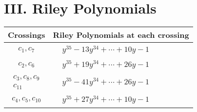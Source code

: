 \documentclass[1p]{elsarticle_modified}
\theoremstyle{definition}
\begin{document}
\centering \section*{ III. Riley Polynomials}
\begin{tabular}{m{50pt}|m{274pt}}
Crossings & \hspace{64pt}Riley Polynomials at each crossing \\
\hline $$\begin{aligned}c_{1},c_{7}\end{aligned}$$&$\begin{aligned}
&y^{35}-13 y^{34}+\cdots+10 y-1
\end{aligned}$\\
\hline $$\begin{aligned}c_{2},c_{6}\end{aligned}$$&$\begin{aligned}
&y^{35}+19 y^{34}+\cdots+26 y-1
\end{aligned}$\\
\hline $$\begin{aligned}c_{3},c_{8},c_{9}\\c_{11}\end{aligned}$$&$\begin{aligned}
&y^{35}-41 y^{34}+\cdots+26 y-1
\end{aligned}$\\
\hline $$\begin{aligned}c_{4},c_{5},c_{10}\end{aligned}$$&$\begin{aligned}
&y^{35}+27 y^{34}+\cdots+10 y-1
\end{aligned}$\\
\hline
\end{tabular}
\vskip 2pc
\end{document}
